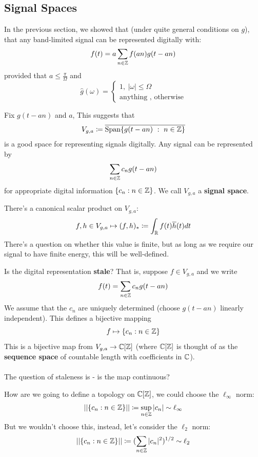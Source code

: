 \documentclass{article}
\begin{document}
\subsection{Signal Spaces}
In the previous section, we showed that (under quite general conditions on $g$), that any band-limited signal can be represented digitally with:
\[f(t) = a \sum_{n \in \mathbb{Z}} f(an) g(t - an)\]
provided that $a \leq \frac{\pi}{\Omega}$ and
\[\widehat{g}(\omega) = \begin{cases}
    1,\ |\omega| \leq \Omega\\
    \text{anything , otherwise}
\end{cases}\]

\begin{definition}
    Fix $g(t - an)$ and $a$, This suggests that
    \[V_{g, a} \coloneqq \overline{\text{Span} \{g(t - an)\ :\ n \in \mathbb{Z}\}}\]
    is a good space for representing signals digitally. Any signal can be represented by
    \[\sum_{n \in \mathbb{Z}} c_n g(t - an)\]
    for appropriate digital information $\{c_n: n \in \mathbb{Z}\}$. We call $V_{g, a}$ a \textbf{signal space}.
\end{definition}

\begin{definition}
There's a canonical scalar product on $V_{g, a}$:    
\[f, h \in V_{g, a} \mapsto (f, h)_* \coloneqq \int_{\mathbb{R}} f(t) \overline{h}(t) dt\]
There's a question on whether this value is finite, but as long as we require our signal to have finite energy, this will be well-defined.
\end{definition}

\begin{question}
    Is the digital representation \textbf{stale}? That is, suppose $f \in V_{g, a}$ and we write
    \[f(t) = \sum_{n \in \mathbb{Z}} c_n g(t - an)\]
    We assume that the $c_n$ are uniquely determined (choose $g(t - an)$ linearly independent). This defines a bijective mapping
    \[f \mapsto \{c_n: n \in \mathbb{Z}\}\]
    This is a bijective map from $V_{g, a} \to \mathbb{C}[\mathbb{Z}]$ (where $\mathbb{C}[\mathbb{Z}]$ is thought of as the \textbf{sequence space} of countable length with coefficients in $\mathbb{C}$).\\\\
    The question of staleness is - is the map continuous?
\end{question}

How are we going to define a topology on $\mathbb{C}[\mathbb{Z}]$, we could choose the $\ell_\infty$ norm:
\[||\{c_n: n \in \mathbb{Z}\}|| \coloneqq \sup_{n \in \mathbb{Z}} |c_n| \sim \ell_\infty\]
But we wouldn't choose this, instead, let's consider the $\ell_2$ norm:
\[||\{c_n: n \in \mathbb{Z}\}|| \coloneqq (\sum_{n \in \mathbb{Z}} |c_n|^2)^{1/2} \sim \ell_2\]
\end{document}
